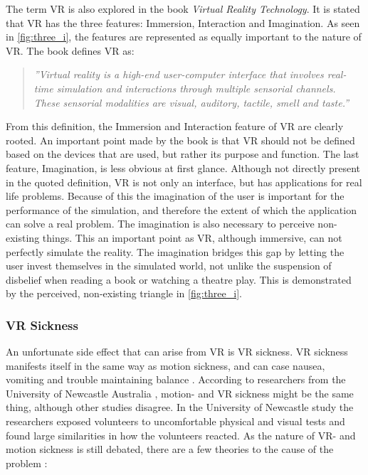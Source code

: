                 The term VR is also explored in the book \emph{Virtual Reality Technology}\cite{threei}. It is stated that VR has the three features: Immersion, Interaction and Imagination. As seen in \cref{fig:three_i}, the features are represented as equally important to the nature of VR. The book defines VR as:
                
                \begin{quote}
                    \textit{''Virtual reality is a high-end user-computer interface that involves real-time simulation and interactions through multiple sensorial channels. These sensorial modalities are visual, auditory, tactile, smell and taste.''}
                \end{quote}
                
                From this definition, the Immersion and Interaction feature of VR are clearly rooted. An important point made by the book is that VR should not be defined based on the devices that are used, but rather its purpose and function. The last feature, Imagination, is less obvious at first glance. Although not directly present in the quoted definition, VR is not only an interface, but has applications for real life problems. Because of this the imagination of the user is important for the performance of the simulation, and therefore the extent of which the application can solve a real problem. The imagination is also necessary to perceive non-existing things. This an important point as VR, although immersive, can not perfectly simulate the reality. The imagination bridges this gap by letting the user invest themselves in the simulated world, not unlike the suspension of disbelief when reading a book or watching a theatre play. This is demonstrated by the perceived, non-existing triangle in \cref{fig:three_i}.
                
                
            \subsubsection{VR Sickness}
                An unfortunate side effect that can arise from VR is VR sickness. VR sickness manifests itself in the same way as motion sickness, and can case nausea, vomiting and trouble maintaining balance \cite{motion_sickness}. According to researchers from the University of Newcastle Australia \cite{vr_sickness}, motion- and VR sickness might be the same thing, although other studies disagree. In the University of Newcastle study the researchers exposed volunteers to uncomfortable physical and visual tests and found large similarities in how the volunteers reacted. As the nature of VR- and motion sickness is still debated, there are a few theories to the cause of the problem \cite{vr_sickness_theories}:
                
